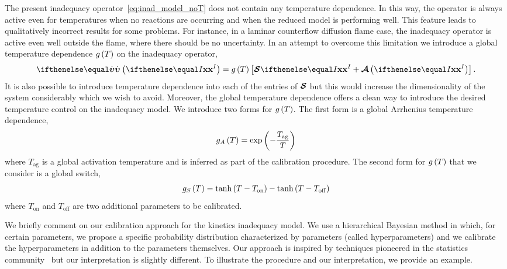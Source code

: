 \documentclass[fontsize=12pt, %
               paper=a4, %
               hyperref]{report}
\begin{document}
  The present inadequacy
  operator~\eqref{eq:inad_model_noT} does not contain any temperature
  dependence.  In this way, the operator is always active even for
  temperatures when no reactions are occurring and when the reduced model
  is performing well.  This feature leads to qualitatively incorrect
  results for some problems.  For instance, in a laminar counterflow
  diffusion flame case, the inadequacy operator is active even well
  outside the flame, where there should be no uncertainty.  In an
  attempt to overcome this limitation we introduce a global temperature
  dependence $g\left(T\right)$ on the inadequacy operator,
  \begin{align}
    \rri\lr{\xc[I]} = g\lr{T}\left[\Sop\xc[I] + \Aop\lr{\xc[I]}\right]. \label{eq:inad_model_T}
  \end{align}
  It is also possible to introduce temperature dependence into each of the entries of $\boldsymbol{\mathcal{S}}$ 
  but this would increase the dimensionality of the system considerably which we wish to 
  avoid.  Moreover, the global temperature dependence offers a clean way to introduce the 
  desired temperature control on the inadequacy model.  We introduce two forms for $g\left(T\right)$.  
  The first form is a global Arrhenius temperature dependence, 
  \begin{align}
    g_{A}\left(T\right) = \exp\left(-\frac{T_{\mathrm{ag}}}{T}\right) \label{eq:gA}
  \end{align}
  where $T_{\mathrm{ag}}$ is a global activation temperature and is inferred as part of the 
  calibration procedure.  The second form for $g\left(T\right)$ that we consider is a global 
  switch, 
  \begin{align}
    g_{S}\left(T\right) = \tanh\left(T - T_{\mathrm{on}}\right) - \tanh\left(T - T_{\mathrm{off}}\right) \label{eq:gS}
  \end{align}
  where $T_{\mathrm{on}}$ and $T_{\mathrm{off}}$ are two additional parameters to be calibrated.

  We briefly comment on our calibration approach for the kinetics inadequacy model.  We use a 
  hierarchical Bayesian method in which, for certain parameters, we propose a specific 
  probability distribution characterized by parameters (called hyperparameters) and we calibrate the 
  hyperparameters in addition to the parameters themselves.  Our approach is inspired by 
  techniques pioneered in the statistics community~\cite{berliner1996hierarchical} but our 
  interpretation is slightly different.  To illustrate the procedure and our interpretation, 
  we provide an example.
  
\end{document}
